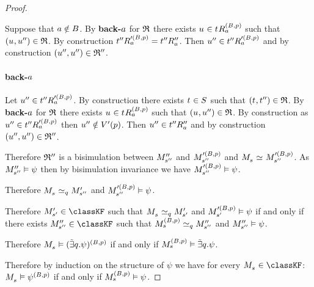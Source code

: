 \begin{proof}
\begin{description}
        Suppose that $\agentA \notin \agentsB$.
        By {\bf back-$\agentA$} for $\bisimulation$ there exists $\kStateU \in \kSuccessorsA[(\agentsB, \atomP)]{\kStateT}$ such that $(\kStateU, \kStateUPP) \in \bisimulation$.
        By construction $\kSuccessorsA[\prime(\agentsB, \atomP)]{\kStateTPP} = \kSuccessorsPPA{\kStateTPP}$.
        Then $\kStateUPP \in \kSuccessorsA[\prime(\agentsB, \atomP)]{\kStateTPP}$ and by construction $(\kStateUPP, \kStateUPP) \in \bisimulation''$.

        \paragraph{back-$\agentA$}
        Let $\kStateUPP \in \kSuccessorsA[\prime(\agentsB, \atomP)]{\kStateTPP}$.
        By construction there exists $\kStateT \in \kStates$ such that $(\kStateT, \kStateTPP) \in \bisimulation$.
        By {\bf back-$\agentA$} for $\bisimulation$ there exists $\kStateU \in \kSuccessorsA[(\agentsB, \atomP)]{\kStateT}$ such that $(\kStateU, \kStateUPP) \in \bisimulation$.
        By construction as $\kStateUPP \in \kSuccessorsA[\prime(\agentsB, \atomP)]{\kStateTPP}$ then $\kStateUPP \notin \kValuationP(\atomP)$.
        Then $\kStateUPP \in \kSuccessorsPPA{\kStateTPP}$ and by construction $(\kStateUPP, \kStateUPP) \in \bisimulation''$.

        Therefore $\bisimulation''$ is a bisimulation between $\kPModelPP{\kStateSPP}$ and $\kPModel[\prime(\agentsB, \atomP)]{\kStateSPP}$ and $\kPModel{\kStateS} \bisimilar \kPModel[\prime(\agentsB, \atomP)]{\kStateSPP}$.
        As $\kPModelPP{\kStateSPP} \entails \psi$ then by bisimulation invariance we have $\kPModel[\prime(\agentsB, \atomP)]{\kStateSPP} \entails \psi$.

        Therefore $\kPModel{\kStateS} \bisimilar[\atomQ] \kPModelP{\kStateSPP}$ and $\kPModel[\prime(\agentsB, \atomP)]{\kStateSPP} \entails \psi$.

        Therefore $\kPModelP{\kStateSP} \in \classKF$ such that $\kPModel{\kStateS} \bisimilar[\atomQ] \kPModelP{\kStateSP}$ and $\kPModel[\prime(\agentsB, \atomP)]{\kStateSP} \entails \psi$ if and only if there exists $\kPModelPP{\kStateSPP} \in \classKF$ such that $\kPModel[(\agentsB, \atomP)]{\kStateS} \bisimilar[\atomQ] \kPModelPP{\kStateSPP}$ and $\kPModelPP{\kStateSPP} \entails \psi$.

        Therefore $\kPModel{\kStateS} \entails (\somebisimsQ \psi)^{(\agentsB, \atomP)}$ if and only if $\kPModel[(\agentsB, \atomP)]{\kStateS} \entails \somebisimsQ \psi$.
\end{description}

Therefore by induction on the structure of $\psi$ we have for every $\kPModel{\kStateS} \in \classKF$: $\kPModel{\kStateS} \entails \psi^{(\agentsB, \atomP)}$ if and only if $\kPModel[(\agentsB, \atomP)]{\kStateS} \entails \psi$.
\end{proof}

